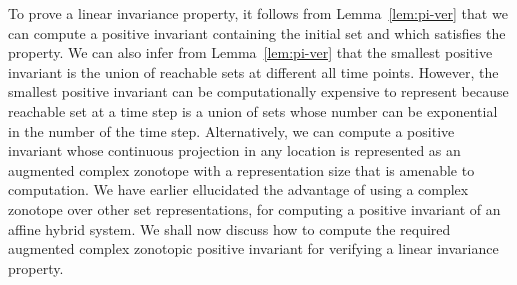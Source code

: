 To prove a linear invariance property, it follows from
Lemma~\ref{lem:pi-ver} that we can compute a positive invariant
containing the initial set and which satisfies the property.  We can
also infer from Lemma~\ref{lem:pi-ver} that the smallest positive
invariant is the union of reachable sets at different all time points.
However, the smallest positive invariant can be computationally
expensive to represent because reachable set at a time step is a union
of sets whose number can be exponential in the number of the time
step.  Alternatively, we can compute a positive invariant whose
continuous projection in any location is represented as an augmented
complex zonotope with a representation size that is amenable to
computation.  We have earlier ellucidated the advantage of using a
complex zonotope over other set representations, for computing a
positive invariant of an affine hybrid system.  We shall now discuss
how to compute the required augmented complex zonotopic positive
invariant for verifying a linear invariance property.

